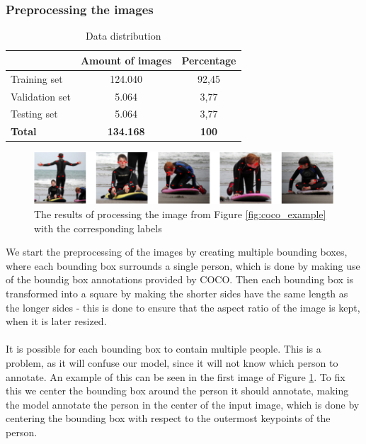 \documentclass[./main.tex]{subfiles}
\begin{document}
\subsubsection{Preprocessing the images}
\begin{table}[t]
    \centering
    \begin{tabular}{l|c|c}
         & Amount of images & Percentage \\
        \hline
        Training set & 124.040 & 92,45 \\
        \hline
        Validation set & 5.064 & 3,77 \\
        \hline
        Testing set & 5.064 & 3,77 \\
        \hline
        \hline
        \textbf{Total} & \textbf{134.168} & \textbf{100} \\
        \hline
    \end{tabular}
    \caption{Data distribution}
    \label{tab:data_distribution}
\end{table}
\begin{figure}[t]
    \centering
    \includegraphics[width = \textwidth - 2 cm]{./entities/crop_img.PNG}
    \caption{The results of processing the image from Figure \ref{fig:coco_example} with the corresponding labels \cite{COCO_article}}
    \label{fig:crop_img}
\end{figure}
We start the preprocessing of the images by creating multiple bounding boxes, where each bounding box surrounds a single person, which is done by making use of the boundig box annotations provided by COCO. Then each bounding box is transformed into a square by making the shorter sides have the same length as the longer sides - this is done to ensure that the aspect ratio of the image is kept, when it is later resized. 
\\
\\
It is possible for each bounding box to contain multiple people. This is a problem, as it will confuse our model, since it will not know which person to annotate. An example of this can be seen in the first image of Figure \ref{fig:crop_img}. To fix this we center the bounding box around the person it should annotate, making the model annotate the person in the center of the input image, which is done by centering the bounding box with respect to the outermost keypoints of the person.
\end{document}
